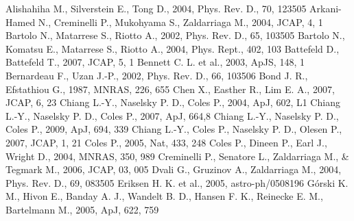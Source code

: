 \documentclass[useAMS,usenatbib,usegraphicx]{mn2e}
\begin{document}
\begin{thebibliography}{99}
  Alishahiha M., Silverstein  E., Tong D., 2004,
  Phys. Rev. D., 70, 123505
  Arkani-Hamed N., Creminelli P., Mukohyama S., Zaldarriaga M., 2004,
  JCAP, 4, 1
  Bartolo N., Matarrese S., Riotto A., 2002, Phys. Rev. D., 65, 103505
  Bartolo N., Komatsu E., Matarrese S., Riotto A., 2004, Phys. Rept., 402, 103
  Battefeld D., Battefeld T., 2007, JCAP, 5, 1
 Bennett C. L.  et al., 2003, ApJS, 148,
1
  Bernardeau F., Uzan J.-P., 2002,  Phys. Rev. D., 66, 103506
Bond J. R., Efstathiou G., 1987, MNRAS, 226, 655
  Chen X., Easther R., Lim E. A., 2007, JCAP, 6, 23
Chiang L.-Y., Naselsky P. D., Coles P., 2004, ApJ, 602, L1
Chiang L.-Y., Naselsky P. D., Coles P., 2007, ApJ, 664,8
Chiang L.-Y., Naselsky P. D., Coles P., 2009, ApJ, 694, 339
Chiang L.-Y., Coles P., Naselsky P. D., Olesen P., 2007, JCAP, 1, 21
 Coles P., 2005, Nat, 433, 248
 Coles P., Dineen P., Earl J., Wright D., 2004, MNRAS, 350, 989
  Creminelli P., Senatore L., Zaldarriaga M., \&
  Tegmark M., 2006, JCAP, 03, 005
  Dvali G., Gruzinov A., Zaldarriaga M., 2004,
  Phys. Rev. D., 69, 083505
 Eriksen H. K.  et al., 2005, astro-ph/0508196
 G\'{o}rski K. M., Hivon E., Banday A. J., Wandelt B. D.,
Hansen F. K., Reinecke E. M., Bartelmann M., 2005, ApJ, 622, 759

\end{thebibliography}
\end{document}
